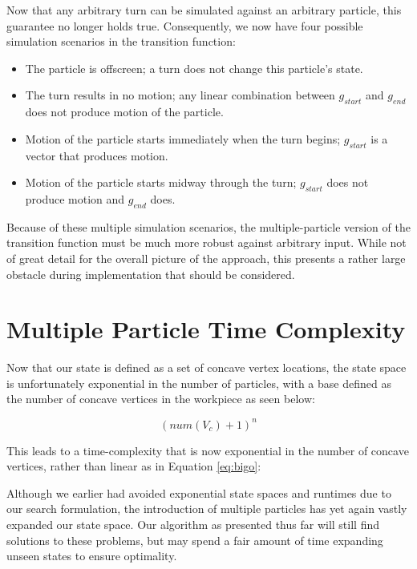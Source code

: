 Now that any arbitrary turn can be simulated against an arbitrary particle, this guarantee no longer holds true. Consequently, we now have four possible simulation scenarios in the transition function:


\begin{itemize}
\item The particle is offscreen; a turn does not change this particle's state.
\item The turn results in no motion; any linear combination between $g_{start}$ and $g_{end}$ does not produce motion of the particle.
\item Motion of the particle starts immediately when the turn begins; $g_{start}$ is a vector that produces motion.
\item Motion of the particle starts midway through the turn; $g_{start}$ does not produce motion and $g_{end}$ does.
\end{itemize}

Because of these multiple simulation scenarios, the multiple-particle version of the transition function must be much more robust against arbitrary input. While not of great detail for the overall picture of the approach, this presents a rather large obstacle during implementation that should be considered.

\section{Multiple Particle Time Complexity}

Now that our state is defined as a set of concave vertex locations, the state space is unfortunately exponential in the number of particles, with a base defined as the number of concave vertices in the workpiece as seen below:

$$
(num(V_{c}) + 1)^n
$$

This leads to a time-complexity that is now exponential in the number of concave vertices, rather than linear as in Equation \eqref{eq:bigo}:

 {
  \label{eq:bigoTotal}
}

Although we earlier had avoided exponential state spaces and runtimes due to our search formulation, the introduction of multiple particles has yet again vastly expanded our state space. Our algorithm as presented thus far will still find solutions to these problems, but may spend a fair amount of time expanding unseen states to ensure optimality.

